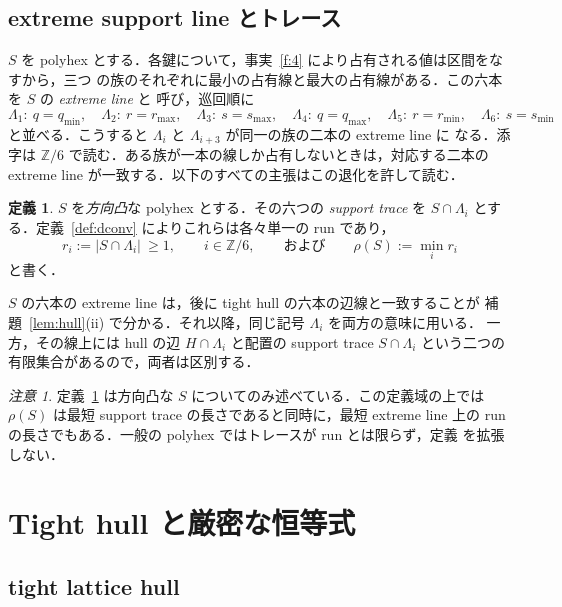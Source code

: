 \documentclass[11pt]{article}
\theoremstyle{plain}
\theoremstyle{definition}
\newtheorem{definition}[theorem]{定義}
\theoremstyle{remark}
\newtheorem{remark}[theorem]{注意}
\newcommand{\Z}{\mathbb{Z}}
\begin{document}
\subsection{extreme support line とトレース}\label{sec:2.3}

\(S\) を polyhex とする．各鍵について，事実~\ref{f:4} により占有される値は区間をなすから，三つ
の族のそれぞれに最小の占有線と最大の占有線がある．この六本を \(S\) の \emph{extreme line} と
呼び，巡回順に
\[
   \Lambda_{1}:\ q=q_{\min},\quad
   \Lambda_{2}:\ r=r_{\max},\quad
   \Lambda_{3}:\ s=s_{\max},\quad
   \Lambda_{4}:\ q=q_{\max},\quad
   \Lambda_{5}:\ r=r_{\min},\quad
   \Lambda_{6}:\ s=s_{\min}
\]
と並べる．こうすると \(\Lambda_{i}\) と \(\Lambda_{i+3}\) が同一の族の二本の extreme line に
なる．添字は \(\Z/6\) で読む．ある族が一本の線しか占有しないときは，対応する二本の extreme
line が一致する．以下のすべての主張はこの退化を許して読む．

\begin{definition}\label{def:traces}
\(S\) を\emph{方向凸}な polyhex とする．その六つの \emph{support trace} を
\(S\cap\Lambda_{i}\) とする．定義~\ref{def:dconv} によりこれらは各々単一の run であり，
\[
   r_{i}:=|S\cap\Lambda_{i}|\ \ge 1 ,\qquad i\in\Z/6,
   \qquad\text{および}\qquad
   \rho(S):=\min_{i} r_{i}
\]
と書く．
\end{definition}

\(S\) の六本の extreme line は，後に tight hull の六本の辺線と一致することが
補題~\ref{lem:hull}(ii) で分かる．それ以降，同じ記号 \(\Lambda_i\) を両方の意味に用いる．
一方，その線上には hull の辺 \(H\cap\Lambda_i\) と配置の support trace
\(S\cap\Lambda_i\) という二つの有限集合があるので，両者は区別する．

\begin{remark}\label{rem:rho}
定義~\ref{def:traces} は方向凸な \(S\) についてのみ述べている．この定義域の上では \(\rho(S)\) は最短 support trace の長さであると同時に，最短 extreme line
上の run の長さでもある．一般の polyhex ではトレースが run とは限らず，定義
を拡張しない．
\end{remark}


\section{Tight hull と厳密な恒等式}\label{sec:hulls}

\subsection{tight lattice hull}\label{sec:2.4}
\end{document}
